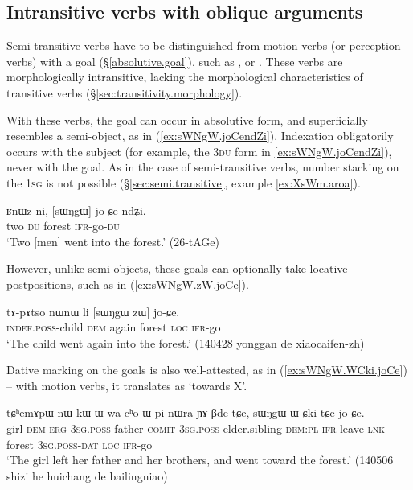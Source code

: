 \subsection{Intransitive verbs with oblique arguments} \label{sec:intr.goal}
  
Semi-transitive verbs have to be distinguished from motion verbs (or perception verbs) with a goal (§\ref{absolutive.goal}), such as ,  or . These verbs are morphologically intransitive, lacking the morphological characteristics of transitive verbs (§\ref{sec:transitivity.morphology}). 
 
With these verbs, the goal can occur in absolutive form, and superficially resembles a semi-object, as  in (\ref{ex:sWNgW.joCendZi}). Indexation obligatorily occurs with the subject (for example, the \textsc{3du} form in \ref{ex:sWNgW.joCendZi}), never with the goal. As in the case of semi-transitive verbs, number stacking on the \textsc{1sg}  is not possible (§\ref{sec:semi.transitive}, example \ref{ex:XsWm.aroa}).

\begin{exe}
\ex   \label{ex:sWNgW.joCendZi}
 \gll ʁnɯz ni, [sɯŋgɯ] jo-ɕe-ndʑi. \\
two \textsc{du} forest \textsc{ifr}-go-\textsc{du} \\
\glt `Two [men] went into the forest.' (26-tAGe) 
\end{exe}

However, unlike semi-objects, these goals can optionally take locative postpositions, such as  in (\ref{ex:sWNgW.zW.joCe}).

\begin{exe}
\ex   \label{ex:sWNgW.zW.joCe}
 \gll tɤ-pɤtso nɯnɯ li [sɯŋgɯ zɯ] jo-ɕe. \\
 \textsc{indef}.\textsc{poss}-child \textsc{dem} again forest \textsc{loc} \textsc{ifr}-go \\
 \glt `The child went again into the forest.' (140428 yonggan de xiaocaifen-zh) 
\end{exe}

Dative marking on the goals is also well-attested, as in (\ref{ex:sWNgW.WCki.joCe}) -- with motion verbs, it translates as `towards X'.

\begin{exe}
\ex   \label{ex:sWNgW.WCki.joCe}
 \gll tɕʰemɤpɯ nɯ kɯ ɯ-wa cʰo ɯ-pi nɯra ɲɤ-βde tɕe, sɯŋgɯ ɯ-ɕki tɕe jo-ɕe. \\
girl \textsc{dem} \textsc{erg} \textsc{3sg}.\textsc{poss}-father \textsc{comit} \textsc{3sg}.\textsc{poss}-elder.sibling \textsc{dem}:\textsc{pl} \textsc{ifr}-leave \textsc{lnk} forest \textsc{3sg}.\textsc{poss}-\textsc{dat} \textsc{loc} \textsc{ifr}-go \\
\glt `The girl left her father and her brothers, and went toward the forest.' (140506 shizi he huichang de bailingniao)
\end{exe}

